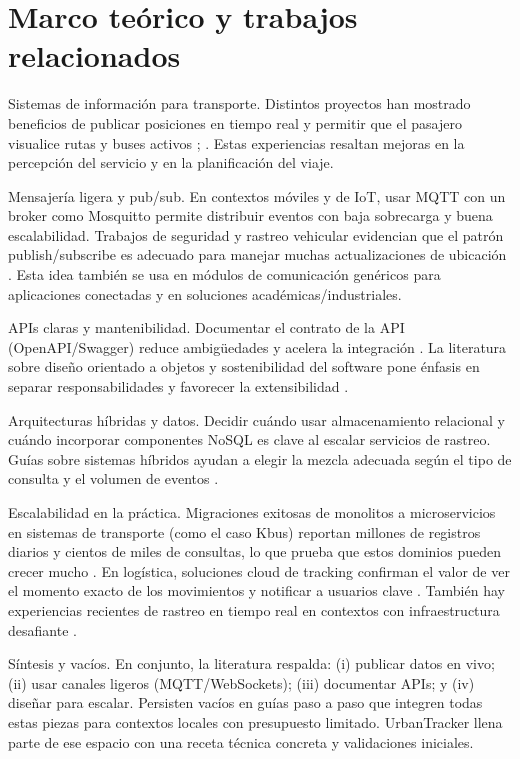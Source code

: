 \section{Marco teórico y trabajos relacionados}
Sistemas de información para transporte. Distintos proyectos han mostrado beneficios de publicar posiciones en tiempo real y permitir que el pasajero visualice rutas y buses activos \cite{cityruta2018new}; \cite{stopbus2016new}. Estas experiencias resaltan mejoras en la percepción del servicio y en la planificación del viaje.

Mensajería ligera y pub/sub. En contextos móviles y de IoT, usar MQTT con un broker como Mosquitto permite distribuir eventos con baja sobrecarga y buena escalabilidad. Trabajos de seguridad y rastreo vehicular evidencian que el patrón publish/subscribe es adecuado para manejar muchas actualizaciones de ubicación \cite{sismo2016}. Esta idea también se usa en módulos de comunicación genéricos para aplicaciones conectadas y en soluciones académicas/industriales.

APIs claras y mantenibilidad. Documentar el contrato de la API (OpenAPI/Swagger) reduce ambigüedades y acelera la integración \cite{easyrest2022}. La literatura sobre diseño orientado a objetos y sostenibilidad del software pone énfasis en separar responsabilidades y favorecer la extensibilidad \cite{poo2023}.

Arquitecturas híbridas y datos. Decidir cuándo usar almacenamiento relacional y cuándo incorporar componentes NoSQL es clave al escalar servicios de rastreo. Guías sobre sistemas híbridos ayudan a elegir la mezcla adecuada según el tipo de consulta y el volumen de eventos \cite{ingenieria2022}.

Escalabilidad en la práctica. Migraciones exitosas de monolitos a microservicios en sistemas de transporte (como el caso Kbus) reportan millones de registros diarios y cientos de miles de consultas, lo que prueba que estos dominios pueden crecer mucho \cite{torres2020}. En logística, soluciones cloud de tracking confirman el valor de ver el momento exacto de los movimientos y notificar a usuarios clave \cite{odesanya2025}. También hay experiencias recientes de rastreo en tiempo real en contextos con infraestructura desafiante \cite{anyango2025}.

Síntesis y vacíos. En conjunto, la literatura respalda: (i) publicar datos en vivo; (ii) usar canales ligeros (MQTT/WebSockets); (iii) documentar APIs; y (iv) diseñar para escalar. Persisten vacíos en guías paso a paso que integren todas estas piezas para contextos locales con presupuesto limitado. UrbanTracker llena parte de ese espacio con una receta técnica concreta y validaciones iniciales.